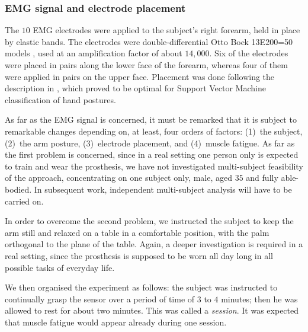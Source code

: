\subsubsection{EMG signal and electrode placement}

The $10$ EMG electrodes were applied to the subject's right forearm,
held in place by elastic bands. The electrodes were
double-differential Otto Bock 13E200=50 models \cite{ottobock}, used
at an amplification factor of about $14,000$. Six of the electrodes
were placed in pairs along the lower face of the forearm, whereas four
of them were applied in pairs on the upper face. Placement was done
following the description in \cite{smagt}, which proved to be optimal
for Support Vector Machine classification of hand postures.

As far as the EMG signal is concerned, it must be remarked that it is
subject to remarkable changes depending on, at least, four orders of
factors: (1)~the subject, (2)~the arm posture, (3)~electrode
placement, and (4)~muscle fatigue. As far as the first problem is
concerned, since in a real setting one person only is expected to
train and wear the prosthesis, we have not investigated multi-subject
feasibility of the approach, concentrating on one subject only, male,
aged $35$ and fully able-bodied. In subsequent work, independent
multi-subject analysis will have to be carried on.

In order to overcome the second problem, we instructed the subject to
keep the arm still and relaxed on a table in a comfortable position,
with the palm orthogonal to the plane of the table. Again, a deeper
investigation is required in a real setting, since the prosthesis is
supposed to be worn all day long in all possible tasks of everyday
life.

%

We then organised the experiment as follows: the subject was
instructed to continually grasp the sensor over a period of time of
$3$ to $4$ minutes; then he was allowed to rest for about two
minutes. This was called a \emph{session}. It was expected that muscle
fatigue would appear already during one session.


